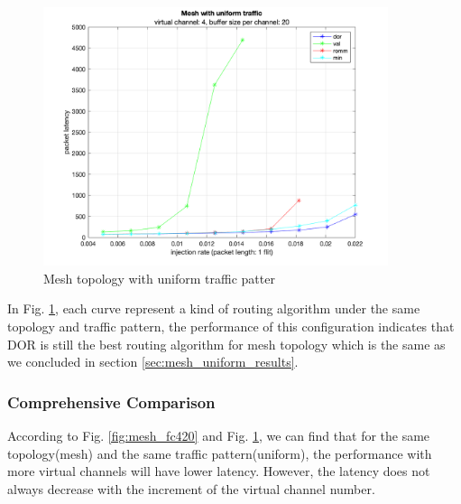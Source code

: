 \begin{figure}[H]
    \centering
    \includegraphics[width=0.9\textwidth]{Images/chap2/flow_control/fc8_20.png}
    \caption{Mesh topology with uniform traffic patter}
    \label{fig:mesh_fc820}
\end{figure}

In Fig. \ref{fig:mesh_fc820}, each curve represent a kind of routing algorithm under the same topology and traffic pattern, the performance of this configuration indicates that DOR is still the best routing algorithm for mesh topology which is the same as we concluded in section \ref{sec:mesh_uniform_results}.

\subsubsection{Comprehensive Comparison}
According to Fig. \ref{fig:mesh_fc420} and Fig. \ref{fig:mesh_fc820}, we can find that for the same topology(mesh) and the same traffic pattern(uniform), the performance with more virtual channels will have lower latency. However, the latency does not always decrease with the increment of the virtual channel number.
